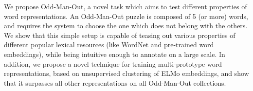 We propose Odd-Man-Out, a novel task which aims to test different properties of word representations. An Odd-Man-Out puzzle is composed of 5 (or more) words, and requires the system to choose the one which does not belong with the others. We show that this simple setup is capable of teasing out various properties of different popular lexical resources (like WordNet and pre-trained word embeddings), while being intuitive enough to annotate on a large scale. In addition, we propose a novel technique for training multi-prototype word representations, based on unsupervised clustering of ELMo embeddings, and show that it surpasses all other representations on all Odd-Man-Out collections.

